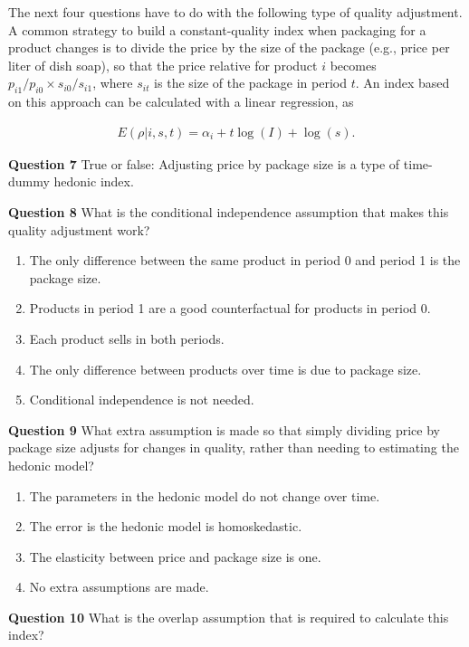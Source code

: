 \documentclass[
]{article}
\begin{document}
The next four questions have to do with the following type of quality adjustment. A common strategy to build a constant-quality index when packaging for a product changes is to divide the price by the size of the package (e.g., price per liter of dish soap), so that the price relative for product \(i\) becomes \(p_{i1} / p_{i0} \times s_{i0} / s_{i1}\), where \(s_{it}\) is the size of the package in period \(t\). An index based on this approach can be calculated with a linear regression, as

\begin{align*}
E(\rho | i, s, t) = \alpha_i + t \log(I) + \log(s).
\end{align*}

\textbf{Question 7} True or false: Adjusting price by package size is a type of time-dummy hedonic index.

\textbf{Question 8} What is the conditional independence assumption that makes this quality adjustment work?

\begin{enumerate}
\def\labelenumi{\alph{enumi})}
\item
  The only difference between the same product in period 0 and period 1 is the package size.
\item
  Products in period 1 are a good counterfactual for products in period 0.
\item
  Each product sells in both periods.
\item
  The only difference between products over time is due to package size.
\item
  Conditional independence is not needed.
\end{enumerate}

\textbf{Question 9} What extra assumption is made so that simply dividing price by package size adjusts for changes in quality, rather than needing to estimating the hedonic model?

\begin{enumerate}
\def\labelenumi{\alph{enumi})}
\item
  The parameters in the hedonic model do not change over time.
\item
  The error is the hedonic model is homoskedastic.
\item
  The elasticity between price and package size is one.
\item
  No extra assumptions are made.
\end{enumerate}

\textbf{Question 10} What is the overlap assumption that is required to calculate this index?
\end{document}
